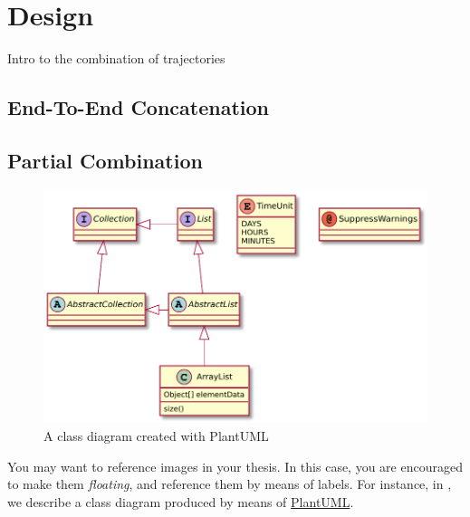 \chapter{Design} 
\label{chap:design}

Intro to the combination of trajectories

\section{End-To-End Concatenation}

\section{Partial Combination}

\begin{figure}
	\centering
	\includegraphics[width=0.5\linewidth]{figures/classes.pdf}
	\caption{A class diagram created with PlantUML}
	\label{fig:classes}
\end{figure}

You may want to reference images in your thesis.
%
In this case, you are encouraged to make them \emph{floating}, and reference them by means of labels.
%
For instance, in , we describe a class diagram produced by means of \href{http://plantuml.com}{PlantUML}.
